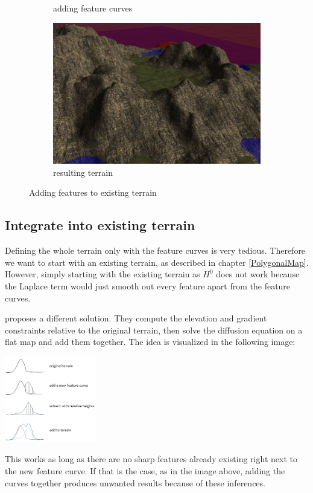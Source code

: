 \documentclass[journal, letterpaper]{IEEEtran}
\begin{document}
\begin{figure}
\begin{subfigure}[b]{0.3\textwidth}
		\caption{adding feature curves}
		\label{fig:featsExist2}
	\end{subfigure}
	\begin{subfigure}[b]{0.3\textwidth}
		\includegraphics[width=\textwidth]{images/diffusionEditExisting3}
		\caption{resulting terrain}
		\label{fig:featsExist3}
	\end{subfigure}
	\caption{Adding features to existing terrain}\label{fig:diffusion2}
\end{figure}
\subsection{Integrate into existing terrain}
Defining the whole terrain only with the feature curves is very tedious. Therefore we want to start with an existing terrain, as described in chapter \ref{PolygonalMap}.
However, simply starting with the existing terrain as $H^0$ does not work because the Laplace term would just smooth out every feature apart from the feature curves.

\cite{FloraPonjouTasseArnaudEmilienMariePauleCaniStefanieHahmannAdrienBernhardt.2014} proposes a different solution. They compute the elevation and gradient constraints relative to the original terrain, then solve the diffusion equation on a flat map and add them together. The idea is visualized in the following image:
\begin{center}
	\includegraphics[width=0.30\textwidth]{images/DiffusionAddFeatures}
\end{center}
This works as long as there are no sharp features already existing right next to the new feature curve. If that is the case, as in the image above, adding the curves together produces unwanted results because of these inferences.
\end{document}
